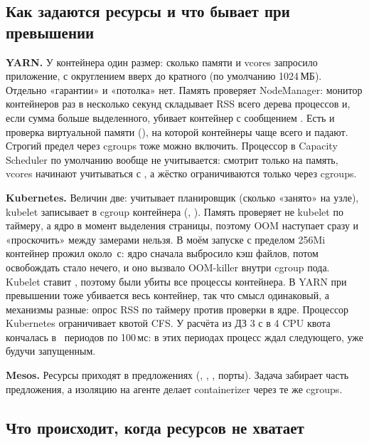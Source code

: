 \subsection{Как задаются ресурсы и что бывает при превышении}

\textbf{YARN.} У контейнера один размер: сколько памяти и vcores запросило приложение, с округлением вверх до кратного  (по умолчанию 1024\,МБ). Отдельно «гарантии» и «потолка» нет. Память проверяет NodeManager: монитор контейнеров раз в несколько секунд складывает RSS всего дерева процессов и, если сумма больше выделенного, убивает контейнер с сообщением . Есть и проверка виртуальной памяти (), на которой контейнеры чаще всего и падают. Строгий предел через cgroups тоже можно включить. Процессор в Capacity Scheduler по умолчанию вообще не учитывается:  смотрит только на память, vcores начинают учитываться с , а жёстко ограничиваются только через cgroups.

\textbf{Kubernetes.} Величин две:  учитывает планировщик (сколько «занято» на узле),  kubelet записывает в cgroup контейнера (, ). Память проверяет не kubelet по таймеру, а ядро в момент выделения страницы, поэтому OOM наступает сразу и «проскочить» между замерами нельзя. В моём запуске с пределом 256Mi контейнер прожил около \oomSeconds\,с: ядро сначала выбросило кэш файлов, потом освобождать стало нечего, и оно вызвало OOM-killer внутри cgroup пода. Kubelet ставит , поэтому были убиты все процессы контейнера. В YARN при превышении тоже убивается весь контейнер, так что смысл одинаковый, а механизмы разные: опрос RSS по таймеру против проверки в ядре. Процессор Kubernetes ограничивает квотой CFS. У расчёта из ДЗ 3 с  в 4 CPU квота кончалась в \hwThrPeriods\ периодов по 100\,мс: в этих периодах процесс ждал следующего, уже будучи запущенным.

\textbf{Mesos.} Ресурсы приходят в предложениях (, , , порты). Задача забирает часть предложения, а изоляцию на агенте делает containerizer через те же cgroups.

\subsection{Что происходит, когда ресурсов не хватает}

